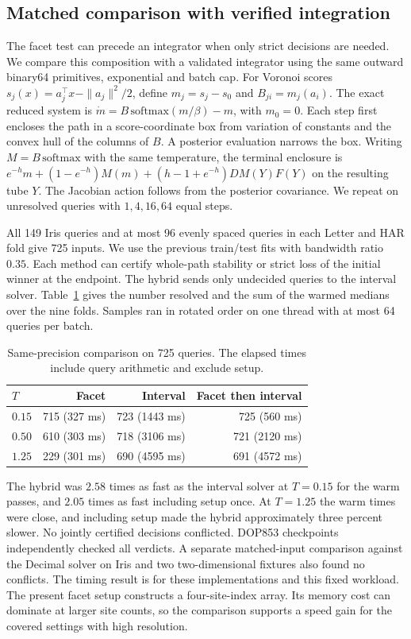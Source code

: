 \subsection{Matched comparison with verified integration}
\label{sec:score-reachability}
The facet test can precede an integrator when only strict decisions are
needed. We compare this composition with a validated integrator using
the same outward binary64 primitives, exponential and batch cap.
For Voronoi scores $s_j(x)=a_j^\top x-\|a_j\|^2/2$, define
$m_j=s_j-s_0$ and $B_{ji}=m_j(a_i)$. The exact reduced system is
$\dot m=B\,\mathrm{softmax}(m/\beta)-m$, with $m_0=0$.
Each step first encloses the path in a score-coordinate box from
variation of constants and the convex hull of the columns of $B$.
A posterior evaluation narrows the box. Writing $M=B\,\mathrm{softmax}$
with the same temperature, the terminal enclosure is
$e^{-h}m+(1-e^{-h})M(m)+(h-1+e^{-h})D M(Y)F(Y)$ on the resulting
tube $Y$. The Jacobian action follows from the posterior covariance.
We repeat on unresolved queries with $1,4,16,64$ equal steps.

All 149 Iris queries and at most 96 evenly spaced queries in each
Letter and HAR fold give 725 inputs. We use the previous train/test
fits with bandwidth ratio $0.35$. Each method can certify whole-path
stability or strict loss of the initial winner at the endpoint. The
hybrid sends only undecided queries to the interval solver.
Table~\ref{tab:verified-cost} gives the number resolved and the
sum of the warmed medians over the nine folds. Samples ran in
rotated order on one thread with at most 64 queries per batch.

\begin{table}[htbp]
\centering
\caption{Same-precision comparison on 725 queries. The elapsed times
include query arithmetic and exclude setup.}
\label{tab:verified-cost}
\begin{tabular}{lrrr}
\toprule
$T$ & Facet & Interval & Facet then interval \\
\midrule
$0.15$ & 715 (327 ms) & 723 (1443 ms) & 725 (560 ms) \\
$0.50$ & 610 (303 ms) & 718 (3106 ms) & 721 (2120 ms) \\
$1.25$ & 229 (301 ms) & 690 (4595 ms) & 691 (4572 ms) \\
\bottomrule
\end{tabular}
\end{table}

The hybrid was $2.58$ times as fast as the interval solver at $T=0.15$
for the warm passes, and $2.05$ times as fast including setup once. At
$T=1.25$ the warm times were close, and including setup made the hybrid
approximately three percent slower. No jointly certified decisions
conflicted. DOP853 checkpoints independently checked all verdicts.
A separate matched-input comparison against the Decimal solver on
Iris and two two-dimensional fixtures also found no conflicts.
The timing result is for these implementations and this fixed
workload. The present facet setup constructs a four-site-index array.
Its memory cost can dominate at larger site counts, so the comparison
supports a speed gain for the covered settings with high resolution.

